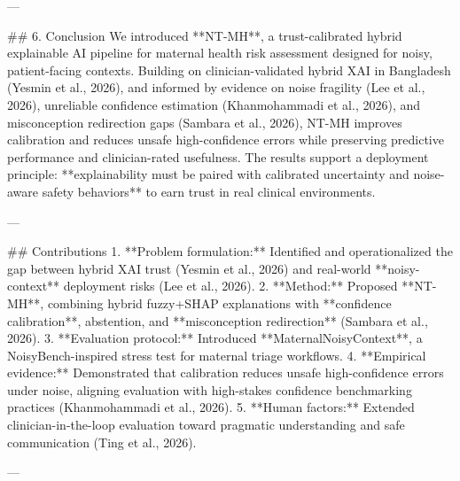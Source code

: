 ---

## 6. Conclusion  
We introduced **NT-MH**, a trust-calibrated hybrid explainable AI pipeline for maternal health risk assessment designed for noisy, patient-facing contexts. Building on clinician-validated hybrid XAI in Bangladesh (Yesmin et al., 2026), and informed by evidence on noise fragility (Lee et al., 2026), unreliable confidence estimation (Khanmohammadi et al., 2026), and misconception redirection gaps (Sambara et al., 2026), NT-MH improves calibration and reduces unsafe high-confidence errors while preserving predictive performance and clinician-rated usefulness. The results support a deployment principle: **explainability must be paired with calibrated uncertainty and noise-aware safety behaviors** to earn trust in real clinical environments.

---

## Contributions  
1. **Problem formulation:** Identified and operationalized the gap between hybrid XAI trust (Yesmin et al., 2026) and real-world **noisy-context** deployment risks (Lee et al., 2026).  
2. **Method:** Proposed **NT-MH**, combining hybrid fuzzy+SHAP explanations with **confidence calibration**, abstention, and **misconception redirection** (Sambara et al., 2026).  
3. **Evaluation protocol:** Introduced **MaternalNoisyContext**, a NoisyBench-inspired stress test for maternal triage workflows.  
4. **Empirical evidence:** Demonstrated that calibration reduces unsafe high-confidence errors under noise, aligning evaluation with high-stakes confidence benchmarking practices (Khanmohammadi et al., 2026).  
5. **Human factors:** Extended clinician-in-the-loop evaluation toward pragmatic understanding and safe communication (Ting et al., 2026).

---